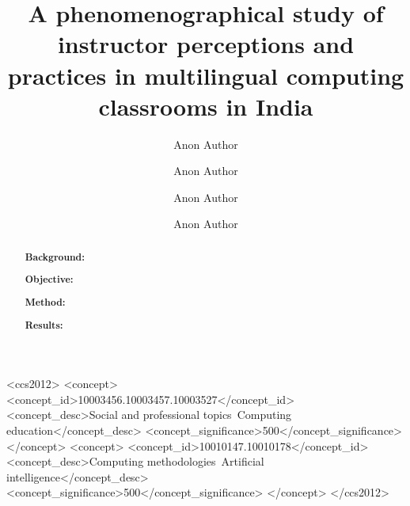 \documentclass[sigconf]{acmart}
\begin{document}
\title[]{A phenomenographical study of instructor perceptions and practices in multilingual computing classrooms in India}



\author{Anon Author}
\orcid{}

\author{Anon Author}
\orcid{}

\author{Anon Author}
\orcid{}

\author{Anon Author}
\orcid{}



\renewcommand{\shortauthors}{}



\begin{abstract}

    \textbf{Background:} 

    \noindent\textbf{Objective:} 

    \noindent\textbf{Method:} 

    \noindent\textbf{Results:} 
\end{abstract}


\begin{CCSXML}
<ccs2012>
  <concept>
   <concept_id>10003456.10003457.10003527</concept_id>
   <concept_desc>Social and professional topics~Computing education</concept_desc>
   <concept_significance>500</concept_significance>
   </concept>
  <concept>
   <concept_id>10010147.10010178</concept_id>
   <concept_desc>Computing methodologies~Artificial intelligence</concept_desc>
   <concept_significance>500</concept_significance>
   </concept>
 </ccs2012>
\end{CCSXML}
\end{document}
